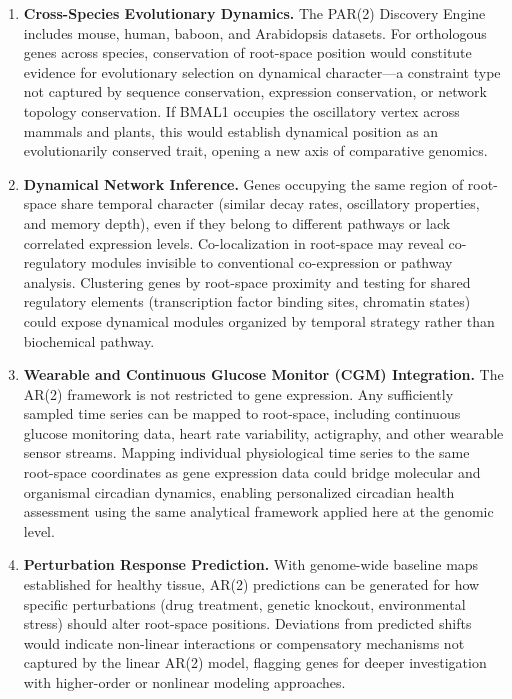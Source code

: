 \documentclass[11pt,letterpaper]{article}
\begin{document}
\begin{enumerate}[leftmargin=*, label=\textbf{\arabic*.}]
\item \textbf{Cross-Species Evolutionary Dynamics.}
The PAR(2) Discovery Engine includes mouse, human, baboon, and Arabidopsis datasets. For orthologous genes across species, conservation of root-space position would constitute evidence for evolutionary selection on dynamical character---a constraint type not captured by sequence conservation, expression conservation, or network topology conservation. If BMAL1 occupies the oscillatory vertex across mammals and plants, this would establish dynamical position as an evolutionarily conserved trait, opening a new axis of comparative genomics.

\item \textbf{Dynamical Network Inference.}
Genes occupying the same region of root-space share temporal character (similar decay rates, oscillatory properties, and memory depth), even if they belong to different pathways or lack correlated expression levels. Co-localization in root-space may reveal co-regulatory modules invisible to conventional co-expression or pathway analysis. Clustering genes by root-space proximity and testing for shared regulatory elements (transcription factor binding sites, chromatin states) could expose dynamical modules organized by temporal strategy rather than biochemical pathway.

\item \textbf{Wearable and Continuous Glucose Monitor (CGM) Integration.}
The AR(2) framework is not restricted to gene expression. Any sufficiently sampled time series can be mapped to root-space, including continuous glucose monitoring data, heart rate variability, actigraphy, and other wearable sensor streams. Mapping individual physiological time series to the same root-space coordinates as gene expression data could bridge molecular and organismal circadian dynamics, enabling personalized circadian health assessment using the same analytical framework applied here at the genomic level.

\item \textbf{Perturbation Response Prediction.}
With genome-wide baseline maps established for healthy tissue, AR(2) predictions can be generated for how specific perturbations (drug treatment, genetic knockout, environmental stress) should alter root-space positions. Deviations from predicted shifts would indicate non-linear interactions or compensatory mechanisms not captured by the linear AR(2) model, flagging genes for deeper investigation with higher-order or nonlinear modeling approaches.


\end{enumerate}
\end{document}
